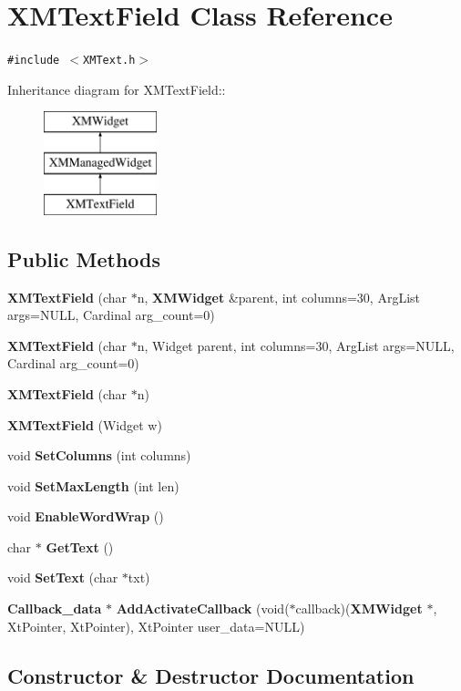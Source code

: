 \section{XMText\-Field  Class Reference}
\label{classXMTextField}
{\tt \#include $<$XMText.h$>$}

Inheritance diagram for XMText\-Field::\begin{figure}[H]
\begin{center}
\leavevmode
\includegraphics[height=3cm]{classXMTextField}
\end{center}
\end{figure}
\subsection*{Public Methods}
\begin{CompactItemize}
\item 
{\bf XMText\-Field} (char $\ast$n, {\bf XMWidget} \&parent, int columns=30, Arg\-List args=NULL, Cardinal arg\_\-count=0)
\item 
{\bf XMText\-Field} (char $\ast$n, Widget parent, int columns=30, Arg\-List args=NULL, Cardinal arg\_\-count=0)
\item 
{\bf XMText\-Field} (char $\ast$n)
\item 
{\bf XMText\-Field} (Widget w)
\item 
void {\bf Set\-Columns} (int columns)
\item 
void {\bf Set\-Max\-Length} (int len)
\item 
void {\bf Enable\-Word\-Wrap} ()
\item 
char $\ast$ {\bf Get\-Text} ()
\item 
void {\bf Set\-Text} (char $\ast$txt)
\item 
{\bf Callback\_\-data} $\ast$ {\bf Add\-Activate\-Callback} (void($\ast$callback)({\bf XMWidget} $\ast$, Xt\-Pointer, Xt\-Pointer), Xt\-Pointer user\_\-data=NULL)
\end{CompactItemize}


\subsection{Constructor \& Destructor Documentation}
